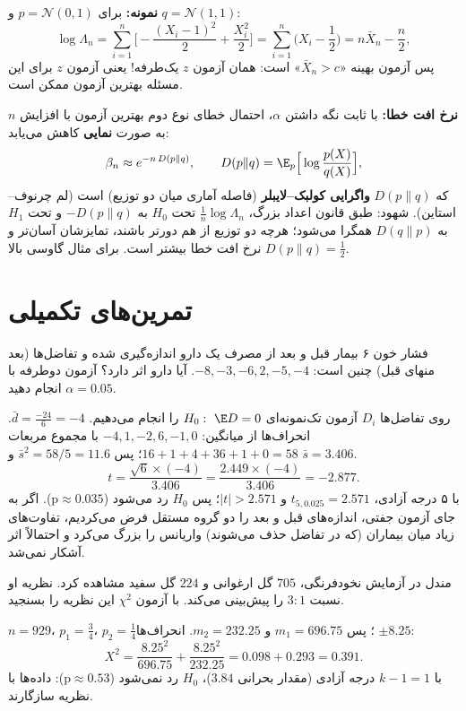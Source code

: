 \textbf{نمونه:} برای $p=\mathcal N(0,1)$ و $q=\mathcal N(1,1)$:
\[
\log\Lambda_n=\sum_{i=1}^n\Big[-\frac{(X_i-1)^2}{2}+\frac{X_i^2}{2}\Big]=\sum_{i=1}^n\Big(X_i-\frac12\Big)=n\bar X_n-\frac n2,
\]
پس آزمون بهینه «$\bar X_n>c$» است: همان آزمون $z$ یک‌طرفه! یعنی آزمون $z$ برای این مسئله بهترین آزمون ممکن است.

\textbf{نرخ افت خطا:} با ثابت نگه داشتن $\alpha$، احتمال خطای نوع دوم بهترین آزمون با افزایش $n$ به صورت \textbf{نمایی} کاهش می‌یابد:
\[
\beta_n\approx e^{-n\,D(p\|q)},\qquad D(p\|q)=\E_p\Big[\log\frac{p(X)}{q(X)}\Big],
\]
که $D(p\|q)$ \textbf{واگرایی کولبک--لایبلر} (فاصله آماری میان دو توزیع) است (لم چرنوف--استاین). شهود: طبق قانون اعداد بزرگ، $\frac1n\log\Lambda_n$ تحت $H_0$ به $-D(p\|q)$ و تحت $H_1$ به $D(q\|p)$ همگرا می‌شود؛ هرچه دو توزیع از هم دورتر باشند، تمایزشان آسان‌تر و نرخ افت خطا بیشتر است. برای مثال گاوسی بالا $D(p\|q)=\frac12$.

\section{تمرین‌های تکمیلی}

\begin{exercise}
فشار خون ۶ بیمار قبل و بعد از مصرف یک دارو اندازه‌گیری شده و تفاضل‌ها (بعد منهای قبل) چنین است: $-8,-3,-6,2,-5,-4$. آیا دارو اثر دارد؟ آزمون دوطرفه با $\alpha=0.05$ انجام دهید.
\end{exercise}
\begin{solution}
روی تفاضل‌ها $D_i$ آزمون تک‌نمونه‌ای $H_0:\ \E D=0$ را انجام می‌دهیم. $\bar d=\frac{-24}{6}=-4$. انحراف‌ها از میانگین: $-4,1,-2,6,-1,0$ با مجموع مربعات $16+1+4+36+1+0=58$؛ پس $\bar s^2=58/5=11.6$ و $\bar s=3.406$.
\[
t=\frac{\sqrt6\times(-4)}{3.406}=\frac{2.449\times(-4)}{3.406}=-2.877 .
\]
با ۵ درجه آزادی، $t_{5,0.025}=2.571$ و $|t|>2.571$؛ پس $H_0$ رد می‌شود ($\text{p}\approx0.035$). اگر به جای آزمون جفتی، اندازه‌های قبل و بعد را دو گروه مستقل فرض می‌کردیم، تفاوت‌های زیاد میان بیماران (که در تفاضل حذف می‌شوند) واریانس را بزرگ می‌کرد و احتمالاً اثر آشکار نمی‌شد.
\end{solution}

\begin{exercise}
مندل در آزمایش نخودفرنگی، $705$ گل ارغوانی و $224$ گل سفید مشاهده کرد. نظریه او نسبت $3:1$ را پیش‌بینی می‌کند. با آزمون $\chi^2$ این نظریه را بسنجید.
\end{exercise}
\begin{solution}
$n=929$، $p_1=\frac34$، $p_2=\frac14$؛ پس $m_1=696.75$ و $m_2=232.25$. انحراف‌ها $\pm8.25$:
\[
X^2=\frac{8.25^2}{696.75}+\frac{8.25^2}{232.25}=0.098+0.293=0.391 .
\]
با $k-1=1$ درجه آزادی (مقدار بحرانی $3.84$)، $H_0$ رد نمی‌شود ($\text{p}\approx0.53$): داده‌ها با نظریه سازگارند.
\end{solution}

